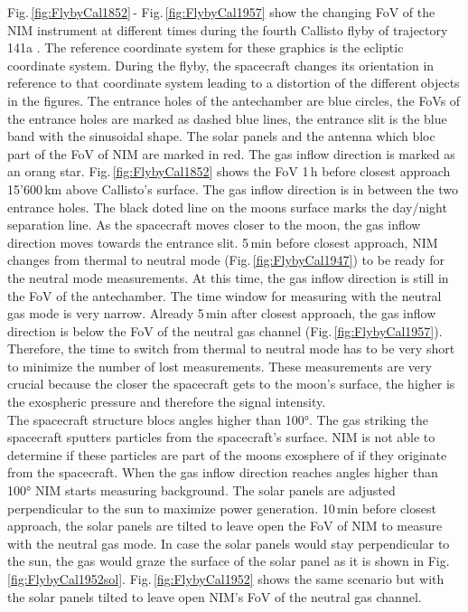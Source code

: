 		Fig.\,\ref{fig:FlybyCal1852}\,- Fig.\,\ref{fig:FlybyCal1957} show the changing FoV of the NIM instrument at different times during the fourth Callisto flyby of trajectory 141a \cite{SOC_Crema3p2}. The reference coordinate system for these graphics is the ecliptic coordinate system. During the flyby, the spacecraft changes its orientation in reference to that coordinate system leading to a distortion of the different objects in the figures. The entrance holes of the antechamber are blue circles, the FoVs of the entrance holes are marked as dashed blue lines, the entrance slit is the blue band with the sinusoidal shape. The solar panels and the antenna which bloc part of the FoV of NIM are marked in red. The gas inflow direction is marked as an orang star. Fig.\,\ref{fig:FlybyCal1852} shows the FoV 1\,h before closest approach 15'600\,km above Callisto's surface. The gas inflow direction is in between the two entrance holes. The black doted line on the moons surface marks the day/night separation line. As the spacecraft moves closer to the moon, the gas inflow direction moves towards the entrance slit. 5\,min before closest approach, NIM changes from thermal to neutral mode (Fig.\,\ref{fig:FlybyCal1947}) to be ready for the neutral mode measurements. At this time, the gas inflow direction is still in the FoV of the antechamber. The time window for measuring with the neutral gas mode is very narrow. Already 5\,min after closest approach, the gas inflow direction is below the FoV of the neutral gas channel (Fig.\,\ref{fig:FlybyCal1957}). Therefore, the time to switch from thermal to neutral mode has to be very short to minimize the number of lost measurements. These measurements are very crucial because the closer the spacecraft gets to the moon's surface, the higher is the exospheric pressure and therefore the signal intensity.\\
		The spacecraft structure blocs angles higher than 100\si{\degree}. The gas striking the spacecraft sputters particles from the spacecraft's surface. NIM is not able to determine if these particles are part of the moons exosphere of if they originate from the spacecraft. When the gas inflow direction reaches angles higher than 100\si{\degree} NIM starts measuring background. The solar panels are adjusted perpendicular to the sun to maximize power generation. 10\,min before closest approach, the solar panels are tilted to leave open the FoV of NIM to measure with the neutral gas mode. In case the solar panels would stay perpendicular to the sun, the gas would graze the surface of the solar panel as it is shown in Fig.\,\ref{fig:FlybyCal1952sol}. Fig.\,\ref{fig:FlybyCal1952} shows the same scenario but with the solar panels tilted to leave open NIM's FoV of the neutral gas channel.\\
